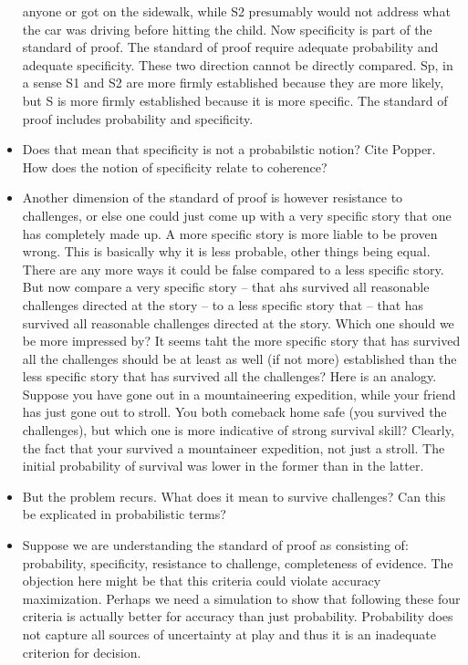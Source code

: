 \documentclass[
  10pt,
  dvipsnames,enabledeprecatedfontcommands]{scrartcl}
\begin{document}
\begin{itemize}
  anyone or got on the sidewalk, while S2 presumably would not address
  what the car was driving before hitting the child. Now specificity is
  part of the standard of proof. The standard of proof require adequate
  probability and adequate specificity. These two direction cannot be
  directly compared. Sp, in a sense S1 and S2 are more firmly
  established because they are more likely, but S is more firmly
  established because it is more specific. The standard of proof
  includes probability and specificity.
\item
  Does that mean that specificity is not a probabilstic notion? Cite
  Popper. How does the notion of specificity relate to coherence?
\item
  Another dimension of the standard of proof is however resistance to
  challenges, or else one could just come up with a very specific story
  that one has completely made up. A more specific story is more liable
  to be proven wrong. This is basically why it is less probable, other
  things being equal. There are any more ways it could be false compared
  to a less specific story. But now compare a very specific story --
  that ahs survived all reasonable challenges directed at the story --
  to a less specific story that -- that has survived all reasonable
  challenges directed at the story. Which one should we be more
  impressed by? It seems taht the more specific story that has survived
  all the challenges should be at least as well (if not more)
  established than the less specific story that has survived all the
  challenges? Here is an analogy. Suppose you have gone out in a
  mountaineering expedition, while your friend has just gone out to
  stroll. You both comeback home safe (you survived the challenges), but
  which one is more indicative of strong survival skill? Clearly, the
  fact that your survived a mountaineer expedition, not just a stroll.
  The initial probability of survival was lower in the former than in
  the latter.
\item
  But the problem recurs. What does it mean to survive challenges? Can
  this be explicated in probabilistic terms?
\item
  Suppose we are understanding the standard of proof as consisting of:
  probability, specificity, resistance to challenge, completeness of
  evidence. The objection here might be that this criteria could violate
  accuracy maximization. Perhaps we need a simulation to show that
  following these four criteria is actually better for accuracy than
  just probability. Probability does not capture all sources of
  uncertainty at play and thus it is an inadequate criterion for
  decision.
\end{itemize}
\end{document}

